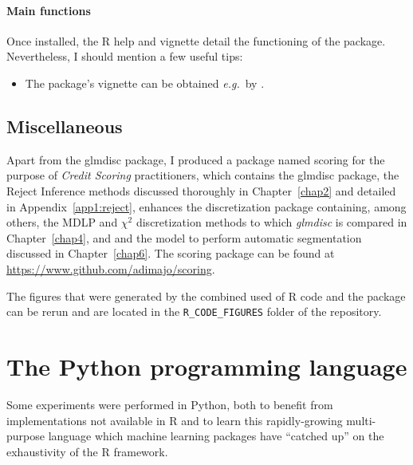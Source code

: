 \paragraph{Main functions}

Once installed, the \textsf{R} help and vignette detail the functioning of the package. Nevertheless, I should mention a few useful tips:

\begin{itemize}
\item The package's vignette can be obtained \textit{e.g.}\ by .
\end{itemize}

\subsection{Miscellaneous}

Apart from the glmdisc package, I produced a package named scoring for the purpose of \textit{Credit Scoring} practitioners, which contains the glmdisc package, the Reject Inference methods discussed thoroughly in Chapter~\ref{chap2} and detailed in Appendix~\ref{app1:reject}, enhances the discretization package containing, among others, the MDLP and $\chi^2$ discretization methods to which \textit{glmdisc} is compared in Chapter~\ref{chap4}, and and the model to perform automatic segmentation discussed in Chapter~\ref{chap6}. The scoring package can be found at \url{https://www.github.com/adimajo/scoring}.

The figures that were generated by the combined used of \textsf{R} code and the  package can be rerun and are located in the \verb|R_CODE_FIGURES| folder of the repository.

\section{The Python programming language}

Some experiments were performed in Python, both to benefit from implementations not available in \textsf{R} and to learn this rapidly-growing multi-purpose language which machine learning packages have ``catched up'' on the exhaustivity of the \textsf{R} framework.

